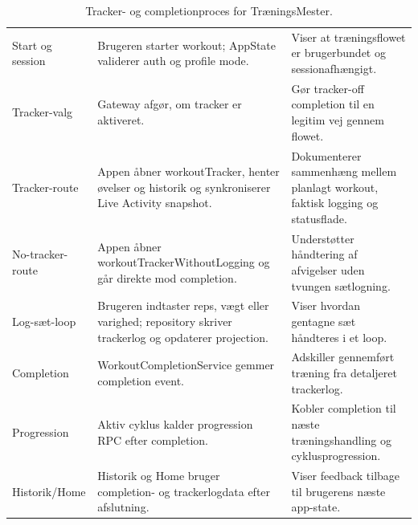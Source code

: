 \begin{table}[htbp]
\small
\renewcommand{\arraystretch}{1.15}
\begin{tabularx}{\textwidth}{>{\RaggedRight\arraybackslash}p{} >{\RaggedRight\arraybackslash}p{} Y}
\toprule
{} &  &  \\
\midrule
Start og session & Brugeren starter workout; AppState validerer auth og profile mode. & Viser at træningsflowet er brugerbundet og sessionafhængigt. \\
Tracker-valg & Gateway afgør, om tracker er aktiveret. & Gør tracker-off completion til en legitim vej gennem flowet. \\
Tracker-route & Appen åbner workoutTracker, henter øvelser og historik og synkroniserer Live Activity snapshot. & Dokumenterer sammenhæng mellem planlagt workout, faktisk logging og statusflade. \\
No-tracker-route & Appen åbner workoutTrackerWithoutLogging og går direkte mod completion. & Understøtter håndtering af afvigelser uden tvungen sætlogning. \\
Log-sæt-loop & Brugeren indtaster reps, vægt eller varighed; repository skriver trackerlog og opdaterer projection. & Viser hvordan gentagne sæt håndteres i et loop. \\
Completion & WorkoutCompletionService gemmer completion event. & Adskiller gennemført træning fra detaljeret trackerlog. \\
Progression & Aktiv cyklus kalder progression RPC efter completion. & Kobler completion til næste træningshandling og cyklusprogression. \\
Historik/Home & Historik og Home bruger completion- og trackerlogdata efter afslutning. & Viser feedback tilbage til brugerens næste app-state. \\
\bottomrule
\end{tabularx}
\caption{Tracker- og completionproces for TræningsMester.}
\label{tab:tm-tracker-flow-bpmn}
\end{table}

